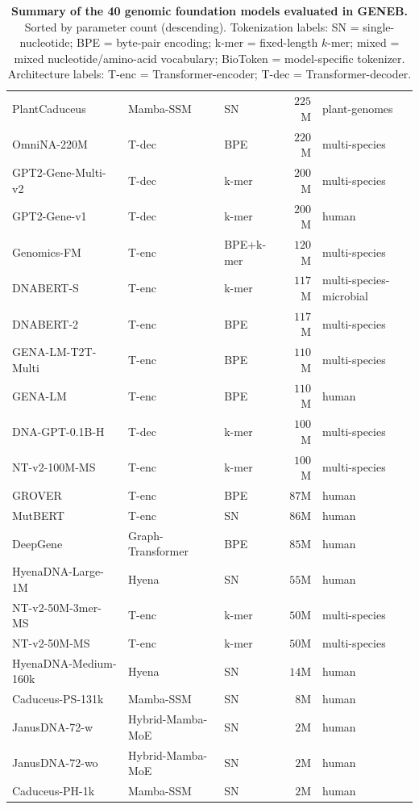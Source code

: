 \documentclass{llmxive}
\begin{document}
\begin{table}[h]
\begin{tabular}{@{}lllrl@{}}
PlantCaduceus             & Mamba-SSM           & SN         & $225$M & plant-genomes \\
OmniNA-220M               & T-dec               & BPE        & $220$M & multi-species \\
GPT2-Gene-Multi-v2        & T-dec               & k-mer      & $200$M & multi-species \\
GPT2-Gene-v1              & T-dec               & k-mer      & $200$M & human \\
Genomics-FM               & T-enc               & BPE+k-mer  & $120$M & multi-species \\
DNABERT-S                 & T-enc               & k-mer      & $117$M & multi-species-microbial \\
DNABERT-2                 & T-enc               & BPE        & $117$M & multi-species \\
GENA-LM-T2T-Multi         & T-enc               & BPE        & $110$M & multi-species \\
GENA-LM                   & T-enc               & BPE        & $110$M & human \\
DNA-GPT-0.1B-H            & T-dec               & k-mer      & $100$M & multi-species \\
NT-v2-100M-MS             & T-enc               & k-mer      & $100$M & multi-species \\
GROVER                    & T-enc               & BPE        & $87$M  & human \\
MutBERT                   & T-enc               & SN         & $86$M  & human \\
DeepGene                  & Graph-Transformer   & BPE        & $85$M  & human \\
HyenaDNA-Large-1M         & Hyena               & SN         & $55$M  & human \\
NT-v2-50M-3mer-MS         & T-enc               & k-mer      & $50$M  & multi-species \\
NT-v2-50M-MS              & T-enc               & k-mer      & $50$M  & multi-species \\
HyenaDNA-Medium-160k      & Hyena               & SN         & $14$M  & human \\
Caduceus-PS-131k          & Mamba-SSM           & SN         & $8$M   & human \\
JanusDNA-72-w             & Hybrid-Mamba-MoE    & SN         & $2$M   & human \\
JanusDNA-72-wo            & Hybrid-Mamba-MoE    & SN         & $2$M   & human \\
Caduceus-PH-1k            & Mamba-SSM           & SN         & $2$M   & human \\
\bottomrule
\end{tabular}
\caption{\textbf{Summary of the 40 genomic foundation models evaluated in GENEB.}
Sorted by parameter count (descending). Tokenization labels: SN = single-nucleotide;
BPE = byte-pair encoding; k-mer = fixed-length $k$-mer; mixed = mixed
nucleotide/amino-acid vocabulary; BioToken = model-specific tokenizer.
Architecture labels: T-enc = Transformer-encoder; T-dec = Transformer-decoder.}
\label{tab:model_summary}
\end{table}
\end{document}
